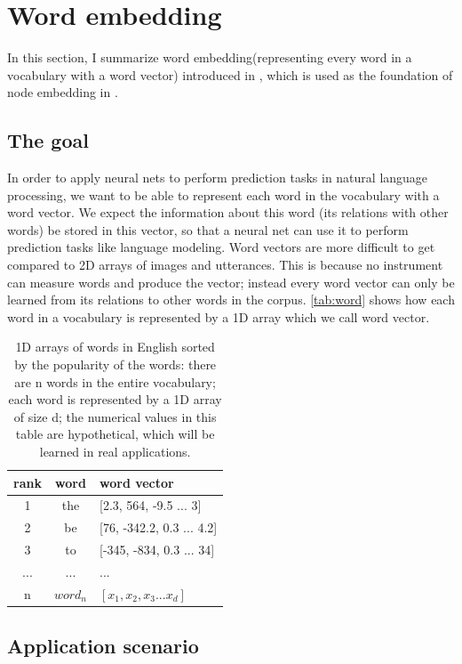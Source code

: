 \documentclass{article}
\begin{document}
\section{Word embedding}
In this section, I summarize word embedding(representing every word in a vocabulary with a word vector) introduced in \cite{mikolov2013efficient}, which is used as the foundation of node embedding in \cite{perozzi2014deepwalk}.

\subsection{The goal}

In order to apply neural nets to perform prediction tasks in natural language processing, we want to be able to represent each word in the vocabulary with a word vector. We expect the information about this word (its relations with other words) be stored in this vector, so that a neural net can use it to perform prediction tasks like language modeling. Word vectors are more difficult to get compared to 2D arrays of images and utterances. This is because no instrument can measure words and produce the vector; instead every word vector can only be learned from its relations to other words in the corpus. \autoref{tab:word} shows how each word in a vocabulary is represented by a 1D array which we call word vector.

\begin{table}[h]
	\centering
	\begin{tabularx}{0.5\textwidth}{|c|c|X|} \hline
		rank & word & word vector \\ \hline
		1 & the & [2.3, 564, -9.5 ... 3] \\ \hline
		2 & be & [76, -342.2, 0.3 ... 4.2] \\ \hline
		3 & to & [-345, -834, 0.3 ... 34] \\ \hline
		... & ... & ... \\ \hline
		n & $ word_n $ & $ [x_1, x_2, x_3 ... x_d] $ \\ \hline
	\end{tabularx}
	\caption{1D arrays of words in English sorted by the popularity of the words: there are n words in the entire vocabulary; each word is represented by a 1D array of size d; the numerical values in this table are hypothetical, which will be learned in real applications.}
	\label{tab:word}
\end{table}

\subsection{Application scenario}
\end{document}

